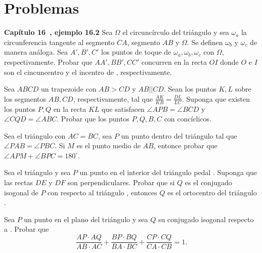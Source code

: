 \newpage
\section{Problemas}

\begin{section-problem}\textbf{Capítulo 16~\cite{AKP16}, ejemplo 16.2}
    Sea $\Omega$ el circuncírculo del triángulo  y sea $\omega_a$ la circunferencia tangente al segmento $CA$, segmento $AB$ y $\Omega$.
    Se definen $\omega_b$ y $\omega_c$ de manera análoga.
    Sea $A', B', C'$ los puntos de toque de $\omega_a, \omega_b, \omega_c$ con $\Omega$, respectivamente.
    Probar que $AA', BB', CC'$ concurren en la recta $OI$ donde $O$ e $I$ son el cincuncentro y el incentro de , respectivamente.
\end{section-problem}

\begin{section-problem}
    Sea $ABCD$ un trapezoide con $AB > CD$ y $AB || CD$.
    Sean los puntos $K, L$ sobre los segmentos $AB, CD$, respectivamente, tal que $\frac{AK}{KB} = \frac{DL}{LC}$.
    Suponga que existen los puntos $P, Q$ en la recta $KL$ que satisfacen $\angle APB = \angle BCD$ y $\angle CQD = \angle ABC$.
    Probar que los puntos $P, Q, B, C$ con concíclicos.
\end{section-problem}

\begin{section-problem}
    Sea el triángulo  con $AC = BC$, sea $P$ un punto dentro del triángulo tal que $\angle PAB = \angle PBC$.
    Si $M$ es el punto medio de $AB$, entonce probar que $\angle APM + \angle BPC = 180^{\circ}$.
\end{section-problem}

\begin{section-problem}
    Sea el triángulo  y sea $P$ un punto en el interior del triángulo pedal .
    Suponga que las rectas $DE$ y $DF$ son perpendiculares.
    Probar que si $Q$ es el conjugado isogonal de $P$ con respecto al triángulo , entonces $Q$ es el ortocentro del triángulo .
\end{section-problem}

\begin{section-problem}
    Sea $P$ un punto en el plano del triángulo  y sea $Q$ su conjugado isogonal respecto a .
    Probar que
    \[
        \frac{AP \cdot AQ}{AB \cdot AC} + \frac{BP \cdot BQ}{BA \cdot BC} + \frac{CP \cdot CQ}{CA \cdot CB} = 1.
    \]
\end{section-problem}

